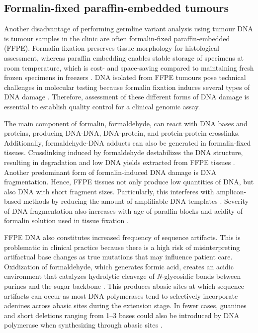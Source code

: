 \subsection{Formalin-fixed paraffin-embedded tumours}

Another disadvantage of performing germline variant analysis using tumour DNA is tumour samples in the clinic are often formalin-fixed paraffin-embedded (\acs{FFPE}). Formalin fixation preserves tissue morphology for histological assessment, whereas paraffin embedding enables stable storage of specimens at room temperature, which is cost- and space-saving compared to maintaining fresh frozen specimens in freezers \cite{Dong2015, Do2015a}. DNA isolated from FFPE tumours pose technical challenges in molecular testing because formalin fixation induces several types of DNA damage \cite{Do2015a}. Therefore, assessment of these different forms of DNA damage is essential to establish quality control for a clinical genomic assay.

The main component of formalin, formaldehyde, can react with DNA bases and proteins, producing DNA-DNA, DNA-protein, and protein-protein crosslinks. Additionally, formaldehyde-DNA adducts can also be generated in formalin-fixed tissues. Crosslinking induced by formaldehyde destabilizes the DNA structure, resulting in degradation and low DNA yields extracted from FFPE tissues \cite{Do2015a}. Another predominant form of formalin-induced DNA damage is DNA fragmentation. Hence, FFPE tissues not only produce low quantities of DNA, but also DNA with short fragment sizes. Particularly, this interferes with amplicon-based methods by reducing the amount of amplifiable DNA templates \cite{Shi2002, Didelot2013, Wong2013}. Severity of DNA fragmentation also increases with age of paraffin blocks and acidity of formalin solution used in tissue fixation \cite{Ludyga2012, Carrick2015}.

FFPE DNA also constitutes increased frequency of sequence artifacts. This is problematic in clinical practice because there is a high risk of misinterpreting artifactual base changes as true mutations that may influence patient care. Oxidization of formaldehyde, which generates formic acid, creates an acidic environment that catalyzes hydrolytic cleavage of \textit{N}-glycosidic bonds between purines and the sugar backbone \cite{Do2015a}. This produces abasic sites at which sequence artifacts can occur as most DNA polymerases tend to selectively incorporate adenines across abasic sites during the extension stage. In fewer cases, guanines and short deletions ranging from 1--3 bases could also be introduced by DNA polymerase when synthesizing through abasic sites \cite{Heyn2010}.


